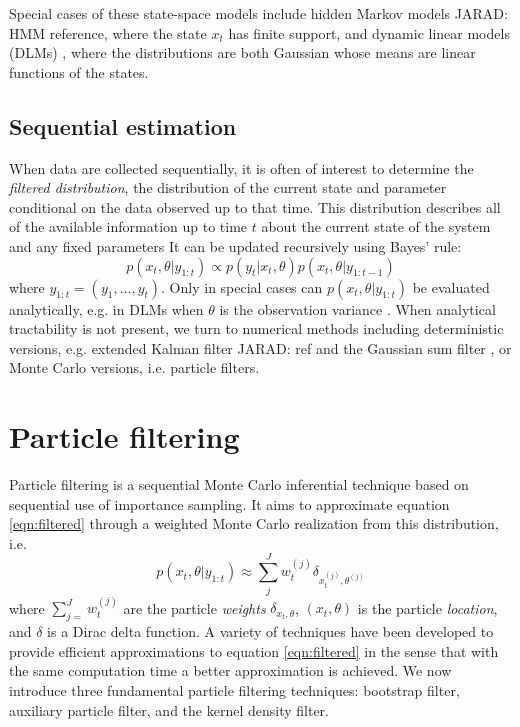 \documentclass{article}
\newcommand{\jarad}[1]{{\color{red}JARAD: #1}}
\begin{document}
Special cases of these state-space models include hidden Markov models \jarad{HMM reference}, where the state $x_t$ has finite support, and dynamic linear models (DLMs) \citep{West:Harr:baye:1997}, where the distributions are both Gaussian whose means are linear functions of the states.

\subsection{Sequential estimation}

When data are collected sequentially, it is often of interest to determine the \emph{filtered distribution}, the distribution of the current state and parameter conditional on the data observed up to that time. This distribution describes all of the available information up to time $t$ about the current state of the system and any fixed parameters It can be updated recursively using Bayes' rule:
\begin{equation}
p(x_t,\theta| y_{1:t}) \propto p(y_t|x_t,\theta)p(x_t,\theta|y_{1:t-1}) \label{eqn:filtered}
\end{equation}
where $y_{1:t} = (y_1,\ldots,y_t)$. Only in special cases can $p(x_t,\theta| y_{1:t})$ be evaluated analytically, e.g. in DLMs when $\theta$ is the observation variance \cite[Sec 4.3,][]{petris2009dynamic}. When analytical tractability is not present, we turn to numerical methods including deterministic versions, e.g. extended Kalman filter \jarad{ref} and the Gaussian sum filter \citep{Alsp:Sore:nonl:1972}, or Monte Carlo versions, i.e. particle filters.




\section{Particle filtering \label{sec:filtering}}

Particle filtering is a sequential Monte Carlo inferential technique based on sequential use of importance sampling. It aims to approximate equation \eqref{eqn:filtered} through a weighted Monte Carlo realization from this distribution, i.e.
\begin{equation}
p(x_t,\theta| y_{1:t}) \approx \sum_{j}^J w_t^{(j)} \delta_{x_t^{(j)},\theta^{(j)}}
\end{equation}
where $\sum_{j=}^J w_t^{(j)}$ are the particle \emph{weights} $\delta_{x_t,\theta}$, $(x_t,\theta)$ is the particle \emph{location}, and $\delta$ is a Dirac delta function. A variety of techniques have been developed to provide efficient approximations to equation \eqref{eqn:filtered} in the sense that with the same computation time a better approximation is achieved. We now introduce three fundamental particle filtering techniques: bootstrap filter, auxiliary particle filter, and the kernel density filter.
\end{document}
